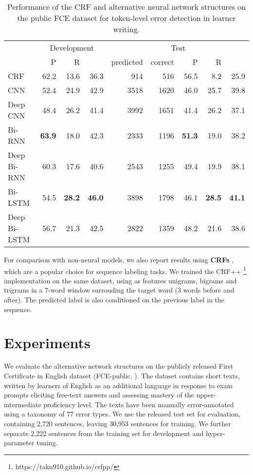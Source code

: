 \documentclass[11pt]{article}
\begin{document}
\begin{table*}
\setlength\tabcolsep{11.0pt}
\begin{tabular}{lrrr|rrrrr} \toprule
 & \multicolumn{3}{c|}{Development}  & \multicolumn{5}{c}{Test} \\
 & P & R &  & predicted & correct & P & R &  \\ \midrule
CRF & 62.2 & 13.6 & 36.3 & 914 & 516 & 56.5 & 8.2 & 25.9 \\ \midrule
CNN & 52.4 & 24.9 & 42.9 & 3518 & 1620 & 46.0 & 25.7 & 39.8 \\
Deep CNN & 48.4 & 26.2 & 41.4 & 3992 & 1651 & 41.4 & 26.2 & 37.1 \\
Bi-RNN & \textbf{63.9} & 18.0 & 42.3 & 2333 & 1196 & \textbf{51.3} & 19.0 & 38.2 \\
Deep Bi-RNN & 60.3 & 17.6 & 40.6 & 2543 & 1255 & 49.4 & 19.9 & 38.1 \\
Bi-LSTM & 54.5 & \textbf{28.2} & \textbf{46.0} & 3898 & 1798 & 46.1 & \textbf{28.5} & \textbf{41.1} \\
Deep Bi-LSTM & 56.7 & 21.3 & 42.5 & 2822 & 1359 & 48.2 & 21.6 & 38.6 \\ \bottomrule
\end{tabular}
\caption{Performance of the CRF and alternative neural network structures on the public FCE dataset for token-level error detection in learner writing.}
\label{tab:structure}
\end{table*}


For comparison with non-neural models, we also report results using \textbf{CRFs} \cite{Lafferty2001}, which are a popular choice for sequence labeling tasks. We trained the CRF++ \footnote{https://taku910.github.io/crfpp/} implementation on the same dataset, using as features unigrams, bigrams and trigrams in a 7-word window surrouding the target word (3 words before and after). The predicted label is also conditioned on the previous label in the sequence.



\section{Experiments}
\label{sec:experiments}

We evaluate the alternative network structures on the publicly released First Certificate in English dataset  (FCE-public, ). The dataset contains short texts, written by learners of English as an additional language in response to exam prompts eliciting free-text answers and assessing mastery of the upper-intermediate proficiency level. 
The texts have been manually error-annotated using a taxonomy of 77 error types. We use the released test set for evaluation, containing 2,720 sentences, leaving 30,953 sentences for training.
We further separate 2,222 sentences from the training set for development and hyper-parameter tuning.
\end{document}
